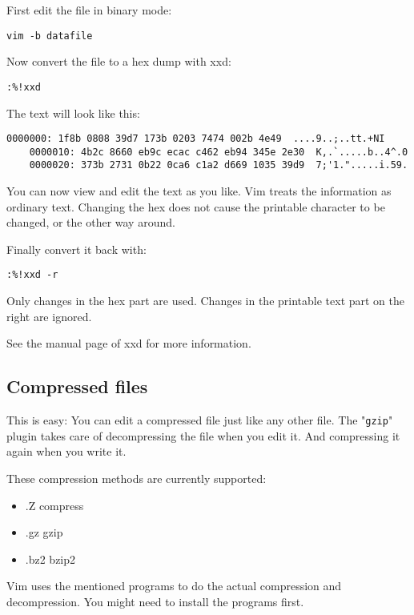 First edit the file in binary mode:

\begin{Verbatim}[samepage=true]
 vim -b datafile
\end{Verbatim}

Now convert the file to a hex dump with xxd:

\begin{Verbatim}[samepage=true]
 :%!xxd
\end{Verbatim}

The text will look like this:

\begin{Verbatim}[samepage=true]
    0000000: 1f8b 0808 39d7 173b 0203 7474 002b 4e49  ....9..;..tt.+NI 
    0000010: 4b2c 8660 eb9c ecac c462 eb94 345e 2e30  K,.`.....b..4^.0 
    0000020: 373b 2731 0b22 0ca6 c1a2 d669 1035 39d9  7;'1.".....i.59. 
\end{Verbatim}

You can now view and edit the text as you like.
Vim treats the information as ordinary text.
Changing the hex does not cause the printable character to be changed, or the other way around.

Finally convert it back with:

\begin{Verbatim}[samepage=true]
 :%!xxd -r
\end{Verbatim}

Only changes in the hex part are used.
Changes in the printable text part on the right are ignored.

See the manual page of xxd for more information.
\subsection{Compressed files}
This is easy: You can edit a compressed file just like any other file.
The "\texttt{gzip}" plugin takes care of decompressing the file when you edit it.
And compressing it again when you write it.

These compression methods are currently supported:
\begin{itemize}
				\item .Z    compress
				\item .gz   gzip
				\item .bz2  bzip2
\end{itemize}
Vim uses the mentioned programs to do the actual compression and decompression.
You might need to install the programs first.
\clearpage

